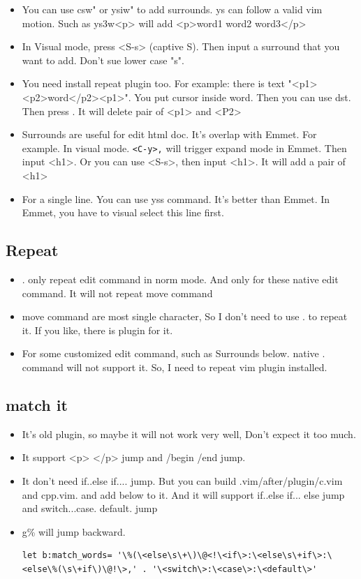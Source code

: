 \documentclass[a4paper,12pt,twoside]{book}
\begin{document}
\begin{itemize}
\begin{itemize}
	   \item You can use csw" or ysiw" to add surrounds. ys can follow a valid vim motion. Such as ys3w<p> will add <p>word1 word2 word3</p>

	   \item In Visual mode, press <S-s> (captive S). Then input a surround that you want to add. Don't sue lower case "s". 
	   \item You need install repeat plugin too. For example: there is text "<p1><p2>word</p2><p1>". You put cursor inside word. Then you can use dst. Then press . It will delete pair of <p1> and <P2>
	    
	    \item Surrounds are useful for edit html doc. It's overlap with Emmet. For example. In visual mode. \verb=<C-y>,= will trigger expand mode in Emmet. Then input <h1>. Or you can use <S-s>, then input <h1>. It will add a pair of <h1> 
	    \item For a single line. You can use yss command. It's better than Emmet. In Emmet, you have to visual select this line first.  
\end{itemize}

\subsection{Repeat}
\begin{itemize}
\item . only repeat edit command in norm mode. And only for these native edit command. It will not repeat move command

\item move command are most single character, So I don't need to use . to repeat it. If you like, there is plugin for it. 

\item For some customized edit command, such as Surrounds below. native . command will not support it. So, I need to repeat vim plugin installed. 
\end{itemize}

\subsection{match it}
\begin{itemize}
		\item It's old plugin, so maybe it will not work very well, Don't expect it too much.
		\item It support <p> </p> jump and /begin /end jump.
		\item It don't need if..else if.... jump. But you can build .vim/after/plugin/c.vim and cpp.vim. and add below to it. And it will support if..else if... else jump and switch...case. default. jump
		\item g\% will jump backward. 
\begin{verbatim}
let b:match_words= '\%(\<else\s\+\)\@<!\<if\>:\<else\s\+if\>:\<else\%(\s\+if\)\@!\>,' . '\<switch\>:\<case\>:\<default\>'
\end{verbatim}


\end{itemize}
\end{itemize}
\end{document}
